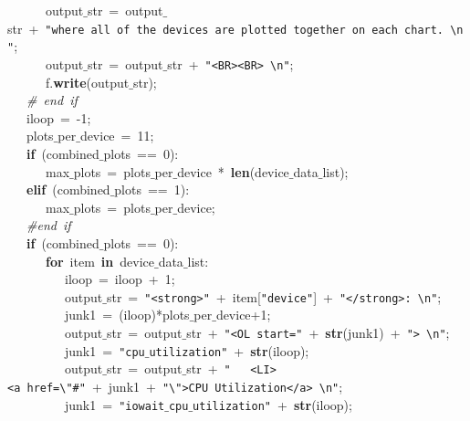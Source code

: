 \mbox{}\ \ \ \ \ \ output$\_$str\ =\ output$\_$str\ +\ \texttt{"{}where\ all\ of\ the\ devices\ are\ plotted\ together\ on\ each\ chart.\ \textbackslash{}n"{}}; \\
\mbox{}\ \ \ \ \ \ output$\_$str\ =\ output$\_$str\ +\ \texttt{"{}\textless{}BR\textgreater{}\textless{}BR\textgreater{}\ \textbackslash{}n"{}}; \\
\mbox{}\ \ \ \ \ \ f.\textbf{write}(output$\_$str); \\
\mbox{}\ \ \ \textit{\#\ end\ if} \\
\mbox{}\ \ \ iloop\ =\ -1; \\
\mbox{}\ \ \ plots$\_$per$\_$device\ =\ 11; \\
\mbox{}\ \ \ \textbf{if}\ (combined$\_$plots\ ==\ 0): \\
\mbox{}\ \ \ \ \ \ max$\_$plots\ =\ plots$\_$per$\_$device\ *\ \textbf{len}(device$\_$data$\_$list); \\
\mbox{}\ \ \ \textbf{elif}\ (combined$\_$plots\ ==\ 1): \\
\mbox{}\ \ \ \ \ \ max$\_$plots\ =\ plots$\_$per$\_$device; \\
\mbox{}\ \ \ \textit{\#end\ if} \\
\mbox{}\ \ \ \textbf{if}\ (combined$\_$plots\ ==\ 0): \\
\mbox{}\ \ \ \ \ \ \textbf{for}\ item\ \textbf{in}\ device$\_$data$\_$list: \\
\mbox{}\ \ \ \ \ \ \ \ \ iloop\ =\ iloop\ +\ 1; \\
\mbox{}\ \ \ \ \ \ \ \ \ output$\_$str\ =\ \texttt{"{}\textless{}strong\textgreater{}"{}}\ +\ item[\texttt{"{}device"{}}]\ +\ \texttt{"{}\textless{}/strong\textgreater{}:\ \textbackslash{}n"{}}; \\
\mbox{}\ \ \ \ \ \ \ \ \ junk1\ =\ (iloop)*plots$\_$per$\_$device+1; \\
\mbox{}\ \ \ \ \ \ \ \ \ output$\_$str\ =\ output$\_$str\ +\ \texttt{"{}\textless{}OL\ start="{}}\ +\ \textbf{str}(junk1)\ +\ \texttt{"{}\textgreater{}\ \textbackslash{}n"{}}; \\
\mbox{}\ \ \ \ \ \ \ \ \ junk1\ =\ \texttt{"{}cpu$\_$utilization"{}}\ +\ \textbf{str}(iloop); \\
\mbox{}\ \ \ \ \ \ \ \ \ output$\_$str\ =\ output$\_$str\ +\ \texttt{"{}\ \ \ \textless{}LI\textgreater{}\textless{}a\ href=\textbackslash{}"{}\#"{}}\ +\ junk1\ +\ \texttt{"{}\textbackslash{}"{}\textgreater{}CPU\ Utilization\textless{}/a\textgreater{}\ \textbackslash{}n"{}}; \\
\mbox{}\ \ \ \ \ \ \ \ \ junk1\ =\ \texttt{"{}iowait$\_$cpu$\_$utilization"{}}\ +\ \textbf{str}(iloop); \\
